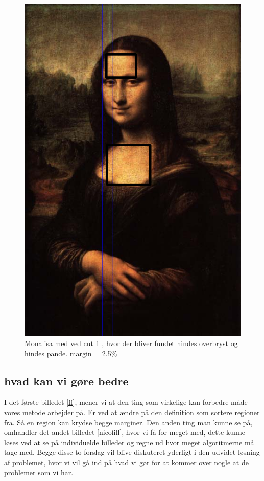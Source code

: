\begin{figure}[h!!]
	\begin{center}
		\includegraphics[scale=0.50,angle=0]{afsnit/afprovning/billeder/BBMonalisacut1.png}
	\end{center}
	\caption[]{Monalisa med ved cut 1 , hvor der bliver fundet hindes
	overbryst og hindes pande. margin  = 2.5\%}
	\label{BBMonalisacut1}
\end{figure}


\subsection{hvad kan vi gøre bedre}
I det første billedet \ref{ff}, mener vi at den ting som virkelige kan
forbedre måde vores metode arbejder på. Er ved at ændre på den
definition som sortere regioner fra. Så en region kan krydse begge
marginer. Den anden ting man kunne se på, omhandler det andet billedet
\ref{nicofill}, hvor vi få for meget med, dette kunne løses ved at se på
individuelde billeder og regne ud hvor meget algoritmerne må tage med.
Begge disse to forslag vil blive diskuteret yderligt i den udvidet
løsning af problemet, hvor vi vil gå ind på hvad vi gør for at kommer
over nogle at de problemer som vi har.
